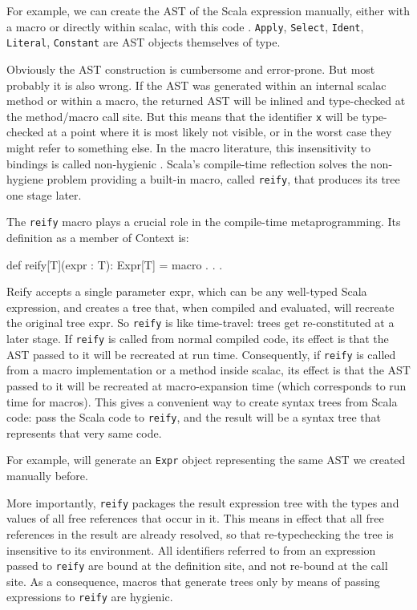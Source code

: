 For example, we can create the AST of the Scala expression  manually,
either with a macro or directly within scalac, with this code
. \texttt{Apply}, \texttt{Select}, \texttt{Ident}, \texttt{Literal},
\texttt{Constant} are AST objects themselves of  type.

Obviously the AST construction is cumbersome and error-prone. But most probably
it is also wrong. If the AST was generated within an internal scalac method or
within a macro, the returned AST will be inlined and type-checked at the
method/macro call site. But this means that the identifier \texttt{x} will be
type-checked at a point where it is most likely not visible, or in the worst
case they might refer to something else. In the macro literature, this
insensitivity to bindings is called non-hygienic . Scala's
compile-time reflection solves the non-hygiene problem providing a built-in
macro, called \texttt{reify}, that produces its tree one stage later.

The \texttt{reify} macro plays a crucial role in the compile-time metaprogramming. Its
definition as a member of Context is:

\begin{scalaCode}
def reify[T](expr : T): Expr[T] = macro . . .
\end{scalaCode}

Reify accepts a single parameter expr, which can be any well-typed Scala
expression, and creates a tree that, when compiled and evaluated, will recreate
the original tree expr. So \texttt{reify} is like time-travel: trees get re-constituted
at a later stage. If \texttt{reify} is called from normal compiled code, its effect is
that the AST passed to it will be recreated at run time.
Consequently, if \texttt{reify} is called from a macro implementation or a method inside
scalac, its effect is that the AST passed to it will be recreated at
macro-expansion time (which corresponds to run time for macros). This gives a
convenient way to create syntax trees from Scala code: pass the Scala code to
\texttt{reify}, and the result will be a syntax tree that represents that very same code.

For example,  will generate an \texttt{Expr} object representing the
same AST we created manually before.

More importantly, \texttt{reify} packages the result expression tree with the types and
values of all free references that occur in it. This means in effect that all
free references in the result are already resolved, so that re-typechecking the
tree is insensitive to its environment. All identifiers referred to from
an expression passed to \texttt{reify} are bound at the definition site, and not re-bound
at the call site. As a consequence, macros that generate trees only by means
of passing expressions to \texttt{reify} are hygienic.

